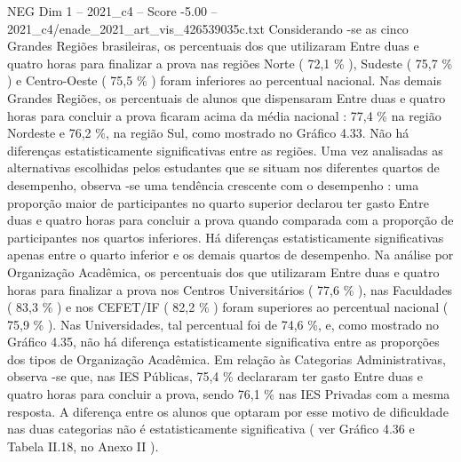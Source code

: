 \begin{textsample}{NEG Dim 1 – 2021\_c4 – Score -5.00 – 2021\_c4/enade\_2021\_art\_vis\_426539035c.txt}
Considerando -se as cinco Grandes Regiões brasileiras, os percentuais dos que utilizaram Entre duas e quatro horas para finalizar a prova nas regiões Norte ( 72,1 \% ), Sudeste ( 75,7 \% ) e Centro-Oeste ( 75,5 \% ) foram inferiores ao percentual nacional.
Nas demais Grandes Regiões, os percentuais de alunos que dispensaram Entre duas e quatro horas para concluir a prova ficaram acima da média nacional : 77,4 \% na região Nordeste e 76,2 \%, na região Sul, como mostrado no Gráfico 4.33.
Não há diferenças estatisticamente significativas entre as regiões.
Uma vez analisadas as alternativas escolhidas pelos estudantes que se situam nos diferentes quartos de desempenho, observa -se uma tendência crescente com o desempenho : uma proporção maior de participantes no quarto superior declarou ter gasto Entre duas e quatro horas para concluir a prova quando comparada com a proporção de participantes nos quartos inferiores.
Há diferenças estatisticamente significativas apenas entre o quarto inferior e os demais quartos de desempenho.
Na análise por Organização Acadêmica, os percentuais dos que utilizaram Entre duas e quatro horas para finalizar a prova nos Centros Universitários ( 77,6 \% ), nas Faculdades ( 83,3 \% ) e nos CEFET/IF ( 82,2 \% ) foram superiores ao percentual nacional ( 75,9 \% ).
Nas Universidades, tal percentual foi de 74,6 \%, e, como mostrado no Gráfico 4.35, não há diferença estatisticamente significativa entre as proporções dos tipos de Organização Acadêmica.
Em relação às Categorias Administrativas, observa -se que, nas IES Públicas, 75,4 \% declararam ter gasto Entre duas e quatro horas para concluir a prova, sendo 76,1 \% nas IES Privadas com a mesma resposta.
A diferença entre os alunos que optaram por esse motivo de dificuldade nas duas categorias não é estatisticamente significativa ( ver Gráfico 4.36 e Tabela II.18, no Anexo II ).

\end{textsample}
